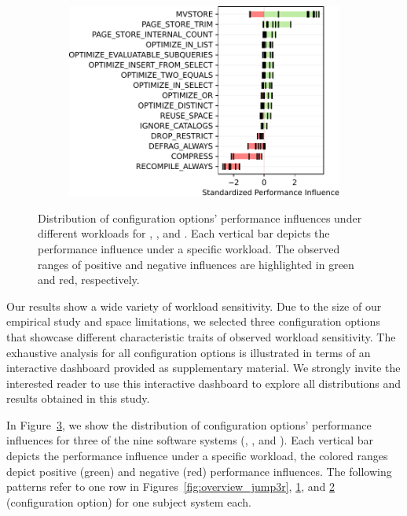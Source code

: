 {{{\begin{figure}
\begin{subfigure}{0.3\linewidth}
		\caption{\zdrei}
		\label{fig:overview_z3}
	\end{subfigure}
	\begin{subfigure}{0.4\linewidth}
		\centering
		\includegraphics[width=\linewidth]{images/h2.pdf}
		\caption{\htwo}
		\label{fig:overview_h2}
	\end{subfigure}
	
	\caption{Distribution of configuration options' performance influences under different workloads for \jumper, \zdrei, and \htwo. Each vertical bar depicts the performance influence under a specific workload. The observed ranges of positive and negative influences are highlighted in green and red, respectively.}
	\label{fig:three_systems}
\end{figure}
	
Our results show a wide variety of workload sensitivity. Due to the size of our empirical study and space limitations, we selected three configuration options that showcase different characteristic traits of observed workload sensitivity. The exhaustive analysis for all configuration options is illustrated in terms of an interactive dashboard provided as supplementary material. We strongly invite the interested reader to use this interactive dashboard to explore all distributions and results obtained in this study.

{In Figure~\ref{fig:three_systems}, we show the distribution of configuration options' performance influences for three of the nine software systems (\jumper, \zdrei, and \htwo). {\color{edited}Each vertical bar depicts the performance influence under a specific workload, the colored ranges depict positive (green) and negative (red) performance influences. The following patterns refer to one row in Figures~\ref{fig:overview_jump3r}, \ref{fig:overview_z3}, and \ref{fig:overview_h2} (configuration option) for one subject system each.}

}}}}
